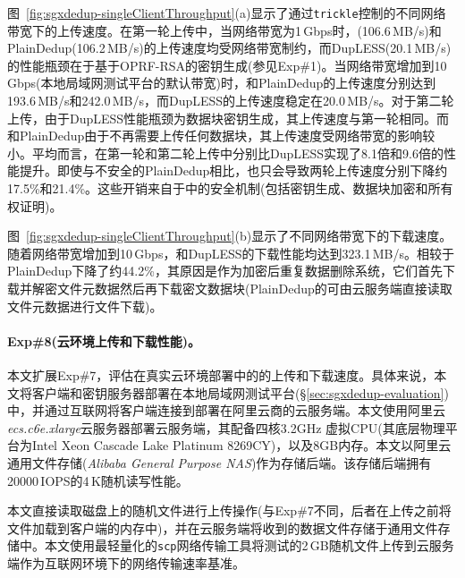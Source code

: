 图~\ref{fig:sgxdedup-singleClientThroughput}(a)显示了通过{\tt trickle}\cite{eriksen05}控制的不同网络带宽下的上传速度。在第一轮上传中，当网络带宽为1\,Gbps时，\sysnameS (106.6\,MB/s)和PlainDedup(106.2\,MB/s)的上传速度均受网络带宽制约，而DupLESS(20.1\,MB/s)的性能瓶颈在于基于OPRF-RSA的密钥生成(参见Exp\#1)。当网络带宽增加到10\,Gbps(本地局域网测试平台的默认带宽)时，\sysnameS 和PlainDedup的上传速度分别达到193.6\,MB/s和242.0\,MB/s，而DupLESS的上传速度稳定在20.0\,MB/s。对于第二轮上传，由于DupLESS性能瓶颈为数据块密钥生成，其上传速度与第一轮相同。而\sysnameS 和PlainDedup由于不再需要上传任何数据块，其上传速度受网络带宽的影响较小。平均而言，\sysnameS 在第一轮和第二轮上传中分别比DupLESS实现了8.1倍和9.6倍的性能提升。即使与不安全的PlainDedup相比，\sysnameS 也只会导致两轮上传速度分别下降约17.5\%和21.4\%。这些开销来自于\sysnameS 中的安全机制(包括密钥生成、数据块加密和所有权证明)。

图~\ref{fig:sgxdedup-singleClientThroughput}(b)显示了不同网络带宽下的下载速度。随着网络带宽增加到10\,Gbps，\sysnameS 和DupLESS的下载性能均达到323.1\,MB/s。相较于PlainDedup下降了约44.2\%，其原因是作为加密后重复数据删除系统，它们首先下载并解密文件元数据然后再下载密文数据块(PlainDedup的可由云服务端直接读取文件元数据进行文件下载)。

\paragraph*{Exp\#8(云环境上传和下载性能)。}本文扩展Exp\#7，评估在真实云环境部署中的\sysnameS 的上传和下载速度。具体来说，本文将客户端和密钥服务器部署在本地局域网测试平台(\S\ref{sec:sgxdedup-evaluation})中，并通过互联网将客户端连接到部署在阿里云商的云服务端。本文使用阿里云\textit{ecs.c6e.xlarge}云服务器部署云服务端，其配备四核3.2GHz 虚拟CPU(其底层物理平台为Intel Xeon Cascade Lake Platinum 8269CY)，以及8GB内存。本文以阿里云通用文件存储(\textit{Alibaba General Purpose NAS})作为存储后端。该存储后端拥有20000\,IOPS的4\,K随机读写性能。

本文直接读取磁盘上的随机文件进行上传操作(与Exp\#7不同，后者在上传之前将文件加载到客户端的内存中)，并在云服务端将收到的数据文件存储于通用文件存储中。本文使用最轻量化的{\tt scp}网络传输工具将测试的2\,GB随机文件上传到云服务端作为互联网环境下的网络传输速率基准。

